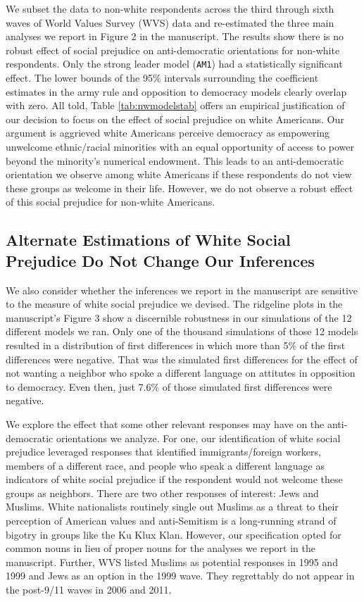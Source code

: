 \documentclass[11pt,]{article}
\begin{document}
We subset the data to non-white respondents across the third through
sixth waves of World Values Survey (WVS) data and re-estimated the three
main analyses we report in Figure 2 in the manuscript. The results show
there is no robust effect of social prejudice on anti-democratic
orientations for non-white respondents. Only the strong leader model
(\texttt{AM1}) had a statistically significant effect. The lower bounds
of the 95\% intervals surrounding the coefficient estimates in the army
rule and opposition to democracy models clearly overlap with zero. All
told, Table \ref{tab:nwmodelstab} offers an empirical justification of
our decision to focus on the effect of social prejudice on white
Americans. Our argument is aggrieved white Americans perceive democracy
as empowering unwelcome ethnic/racial minorities with an equal
opportunity of access to power beyond the minority's numerical
endowment. This leads to an anti-democratic orientation we observe among
white Americans if these respondents do not view these groups as welcome
in their life. However, we do not observe a robust effect of this social
prejudice for non-white Americans.

\hypertarget{alternate-estimations-of-white-social-prejudice-do-not-change-our-inferences}{%
\subsection{Alternate Estimations of White Social Prejudice Do Not
Change Our
Inferences}\label{alternate-estimations-of-white-social-prejudice-do-not-change-our-inferences}}

We also consider whether the inferences we report in the manuscript are
sensitive to the measure of white social prejudice we devised. The
ridgeline plots in the manuscript's Figure 3 show a discernible
robustness in our simulations of the 12 different models we ran. Only
one of the thousand simulations of those 12 models resulted in a
distribution of first differences in which more than 5\% of the first
differences were negative. That was the simulated first differences for
the effect of not wanting a neighbor who spoke a different language on
attitutes in opposition to democracy. Even then, just 7.6\% of those
simulated first differences were negative.

We explore the effect that some other relevant responses may have on the
anti-democratic orientations we analyze. For one, our identification of
white social prejudice leveraged responses that identified
immigrants/foreign workers, members of a different race, and people who
speak a different language as indicators of white social prejudice if
the respondent would not welcome these groups as neighbors. There are
two other responses of interest: Jews and Muslims. White nationalists
routinely single out Muslims as a threat to their perception of American
values and anti-Semitism is a long-running strand of bigotry in groups
like the Ku Klux Klan. However, our specification opted for common nouns
in lieu of proper nouns for the analyses we report in the manuscript.
Further, WVS listed Muslims as potential responses in 1995 and 1999 and
Jews as an option in the 1999 wave. They regrettably do not appear in
the post-9/11 waves in 2006 and 2011.
\end{document}
